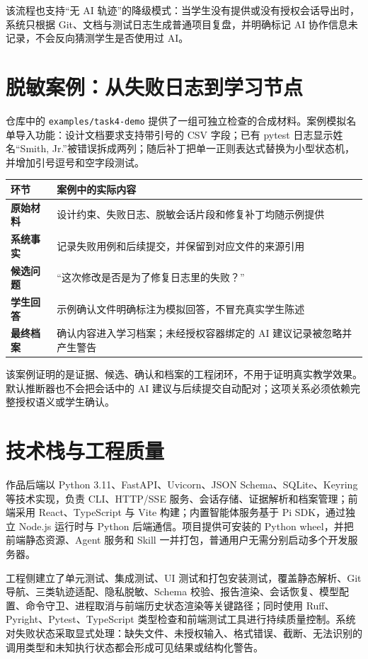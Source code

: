 \documentclass[UTF8,a4paper,12pt]{ctexart}
\begin{document}
该流程也支持“无 AI 轨迹”的降级模式：当学生没有提供或没有授权会话导出时，系统只根据 Git、文档与测试日志生成普通项目复盘，并明确标记 AI 协作信息未记录，不会反向猜测学生是否使用过 AI。

\section{脱敏案例：从失败日志到学习节点}

仓库中的 \texttt{examples/task4-demo} 提供了一组可独立检查的合成材料。案例模拟名单导入功能：设计文档要求支持带引号的 CSV 字段；已有 pytest 日志显示姓名“Smith, Jr.”被错误拆成两列；随后补丁把单一正则表达式替换为小型状态机，并增加引号逗号和空字段测试。

\begin{center}
\small
\begin{tabularx}{\textwidth}{>{\bfseries}p{}X}
\toprule
环节 & 案例中的实际内容 \\
\midrule
原始材料 & 设计约束、失败日志、脱敏会话片段和修复补丁均随示例提供 \\
系统事实 & 记录失败用例和后续提交，并保留到对应文件的来源引用 \\
候选问题 & “这次修改是否是为了修复日志里的失败？” \\
学生回答 & 示例确认文件明确标注为模拟回答，不冒充真实学生陈述 \\
最终档案 & 确认内容进入学习档案；未经授权容器绑定的 AI 建议记录被忽略并产生警告 \\
\bottomrule
\end{tabularx}
\end{center}

该案例证明的是证据、候选、确认和档案的工程闭环，不用于证明真实教学效果。默认推断器也不会把会话中的 AI 建议与后续提交自动配对；这项关系必须依赖完整授权语义或学生确认。

\section{技术栈与工程质量}

作品后端以 Python 3.11、FastAPI、Uvicorn、JSON Schema、SQLite、Keyring 等技术实现，负责 CLI、HTTP/SSE 服务、会话存储、证据解析和档案管理；前端采用 React、TypeScript 与 Vite 构建；内置智能体服务基于 Pi SDK，通过独立 Node.js 运行时与 Python 后端通信。项目提供可安装的 Python wheel，并把前端静态资源、Agent 服务和 Skill 一并打包，普通用户无需分别启动多个开发服务器。

工程侧建立了单元测试、集成测试、UI 测试和打包安装测试，覆盖静态解析、Git 导航、三类轨迹适配、隐私脱敏、Schema 校验、报告渲染、会话恢复、模型配置、命令守卫、进程取消与前端历史状态渲染等关键路径；同时使用 Ruff、Pyright、Pytest、TypeScript 类型检查和前端测试工具进行持续质量控制。系统对失败状态采取显式处理：缺失文件、未授权输入、格式错误、截断、无法识别的调用类型和未知执行状态都会形成可见结果或结构化警告。
\end{document}
